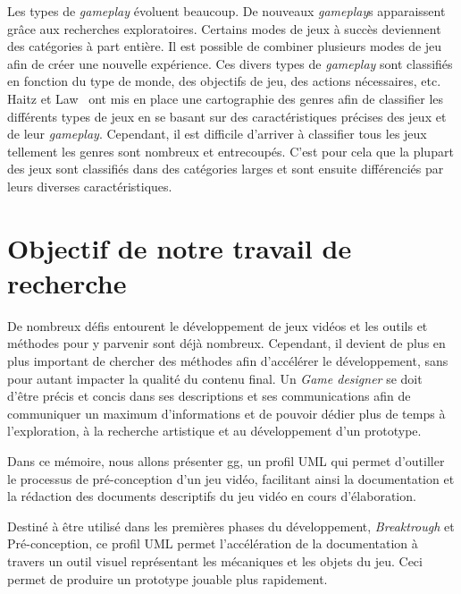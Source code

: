 Les types de \emph{gameplay} évoluent beaucoup. De nouveaux \emph{gameplay}s apparaissent grâce aux recherches exploratoires. Certains modes de jeux à succès deviennent des catégories à part entière. Il est possible de combiner plusieurs modes de jeu afin de créer une nouvelle expérience. Ces divers types de \emph{gameplay} sont classifiés en fonction du type de monde, des objectifs de jeu, des actions nécessaires, etc. Haitz et Law~\cite{HeintzStephanie2015TGGM} ont mis en place une cartographie des genres afin de classifier les différents types de jeux en se basant sur des caractéristiques précises des jeux et de leur \emph{gameplay}. Cependant, il est difficile d'arriver à classifier tous les jeux tellement les genres sont nombreux et entrecoupés. C'est pour cela que la plupart des jeux sont classifiés dans des catégories larges et sont ensuite différenciés par leurs diverses caractéristiques.



\section{Objectif de notre travail de recherche}


De nombreux défis entourent le développement de jeux vidéos et les outils et méthodes pour y parvenir sont déjà nombreux. Cependant, il devient de plus en plus important de chercher des méthodes afin d'accélérer le développement, sans pour autant impacter la qualité du contenu final. Un \emph{Game designer} se doit d'être précis et concis dans ses descriptions et ses communications afin de communiquer un maximum d'informations et de pouvoir dédier plus de temps à l'exploration, à la recherche artistique et au développement d'un prototype. 



Dans ce mémoire, nous allons présenter \gls{gg}, un profil UML \cite{ReferenceBibliographique} qui permet d'outiller le processus de pré-conception d'un jeu vidéo, facilitant ainsi la documentation et la rédaction des documents descriptifs du jeu vidéo en cours d'élaboration.

Destiné à être utilisé dans les premières phases du développement, \emph{Breaktrough} et Pré-conception, ce profil UML permet l'accélération de la documentation à travers un outil visuel représentant les mécaniques et les objets du jeu. Ceci permet de produire un prototype jouable plus rapidement.

